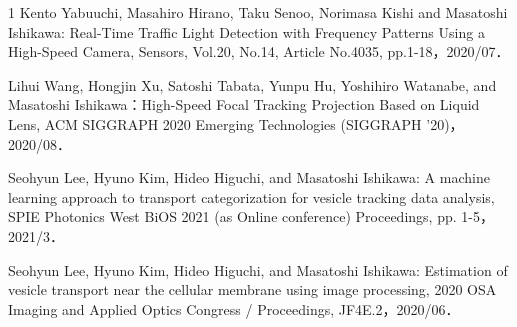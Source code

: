 \begin{査読付}{1}
Kento Yabuuchi, Masahiro Hirano, Taku Senoo, Norimasa Kishi and Masatoshi Ishikawa: Real-Time Traffic Light Detection with Frequency Patterns Using a High-Speed Camera, Sensors, Vol.20, No.14, Article No.4035, pp.1-18，2020/07．

Lihui Wang, Hongjin Xu, Satoshi Tabata, Yunpu Hu, Yoshihiro Watanabe, and Masatoshi Ishikawa：High-Speed Focal Tracking Projection Based on Liquid Lens, ACM SIGGRAPH 2020 Emerging Technologies (SIGGRAPH '20)，2020/08．

Seohyun Lee, Hyuno Kim, Hideo Higuchi, and Masatoshi Ishikawa: A machine learning approach to transport categorization for vesicle tracking data analysis, SPIE Photonics West BiOS 2021 (as Online conference) Proceedings, pp. 1-5，2021/3．

Seohyun Lee, Hyuno Kim, Hideo Higuchi, and Masatoshi Ishikawa: Estimation of vesicle transport near the cellular membrane using image processing, 2020 OSA Imaging and Applied Optics Congress / Proceedings, JF4E.2，2020/06．


\end{査読付}
